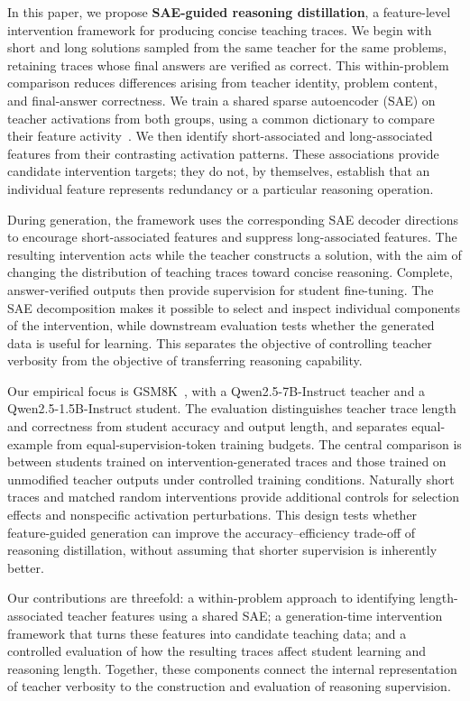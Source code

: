 In this paper, we propose \textbf{SAE-guided reasoning distillation}, a feature-level intervention framework for producing concise teaching traces.
We begin with short and long solutions sampled from the same teacher for the same problems, retaining traces whose final answers are verified as correct.
This within-problem comparison reduces differences arising from teacher identity, problem content, and final-answer correctness.
We train a shared sparse autoencoder (SAE) on teacher activations from both groups, using a common dictionary to compare their feature activity~\citep{cunningham2023sparse,gao2024scaling}.
We then identify short-associated and long-associated features from their contrasting activation patterns.
These associations provide candidate intervention targets; they do not, by themselves, establish that an individual feature represents redundancy or a particular reasoning operation.

During generation, the framework uses the corresponding SAE decoder directions to encourage short-associated features and suppress long-associated features.
The resulting intervention acts while the teacher constructs a solution, with the aim of changing the distribution of teaching traces toward concise reasoning.
Complete, answer-verified outputs then provide supervision for student fine-tuning.
The SAE decomposition makes it possible to select and inspect individual components of the intervention, while downstream evaluation tests whether the generated data is useful for learning.
This separates the objective of controlling teacher verbosity from the objective of transferring reasoning capability.

Our empirical focus is GSM8K~\citep{cobbe2021training}, with a Qwen2.5-7B-Instruct teacher and a Qwen2.5-1.5B-Instruct student.
The evaluation distinguishes teacher trace length and correctness from student accuracy and output length, and separates equal-example from equal-supervision-token training budgets.
The central comparison is between students trained on intervention-generated traces and those trained on unmodified teacher outputs under controlled training conditions.
Naturally short traces and matched random interventions provide additional controls for selection effects and nonspecific activation perturbations.
This design tests whether feature-guided generation can improve the accuracy--efficiency trade-off of reasoning distillation, without assuming that shorter supervision is inherently better.

Our contributions are threefold: a within-problem approach to identifying length-associated teacher features using a shared SAE; a generation-time intervention framework that turns these features into candidate teaching data; and a controlled evaluation of how the resulting traces affect student learning and reasoning length.
Together, these components connect the internal representation of teacher verbosity to the construction and evaluation of reasoning supervision.
